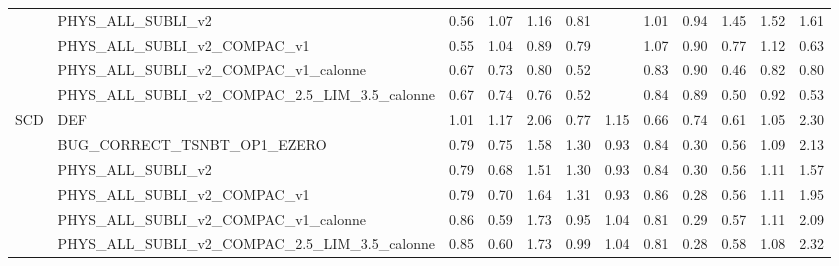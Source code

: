 \begin{tabular}{llllllllllll}
 & PHYS_ALL_SUBLI_v2 & 0.56 & 1.07 & 1.16 & 0.81 &  & 1.01 & 0.94 & 1.45 & 1.52 & 1.61 \\
 & PHYS_ALL_SUBLI_v2_COMPAC_v1 & 0.55 & 1.04 & 0.89 & 0.79 &  & 1.07 & 0.90 & 0.77 & 1.12 & 0.63 \\
 & PHYS_ALL_SUBLI_v2_COMPAC_v1_calonne & 0.67 & 0.73 & 0.80 & 0.52 &  & 0.83 & 0.90 & 0.46 & 0.82 & 0.80 \\
 & PHYS_ALL_SUBLI_v2_COMPAC_2.5_LIM_3.5_calonne & 0.67 & 0.74 & 0.76 & 0.52 &  & 0.84 & 0.89 & 0.50 & 0.92 & 0.53 \\
\cline{1-12}
\multirow[t]{6}{*}{SCD} & DEF & 1.01 & 1.17 & 2.06 & 0.77 & 1.15 & 0.66 & 0.74 & 0.61 & 1.05 & 2.30 \\
 & BUG_CORRECT_TSNBT_OP1_EZERO & 0.79 & 0.75 & 1.58 & 1.30 & 0.93 & 0.84 & 0.30 & 0.56 & 1.09 & 2.13 \\
 & PHYS_ALL_SUBLI_v2 & 0.79 & 0.68 & 1.51 & 1.30 & 0.93 & 0.84 & 0.30 & 0.56 & 1.11 & 1.57 \\
 & PHYS_ALL_SUBLI_v2_COMPAC_v1 & 0.79 & 0.70 & 1.64 & 1.31 & 0.93 & 0.86 & 0.28 & 0.56 & 1.11 & 1.95 \\
 & PHYS_ALL_SUBLI_v2_COMPAC_v1_calonne & 0.86 & 0.59 & 1.73 & 0.95 & 1.04 & 0.81 & 0.29 & 0.57 & 1.11 & 2.09 \\
 & PHYS_ALL_SUBLI_v2_COMPAC_2.5_LIM_3.5_calonne & 0.85 & 0.60 & 1.73 & 0.99 & 1.04 & 0.81 & 0.28 & 0.58 & 1.08 & 2.32 \\
\cline{1-12}
\bottomrule
\end{tabular}
